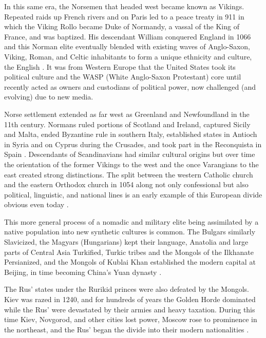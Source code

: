 In this same era, the Norsemen that headed west became known as Vikings.
Repeated raids up French rivers and on Paris led to a peace treaty in 911 in which the Viking Rollo became Duke of Normandy, a vassal of the King of France, and was baptized.
His descendant William conquered England in 1066 and this Norman elite eventually blended with existing waves of Anglo-Saxon, Viking, Roman, and Celtic inhabitants to form a unique ethnicity and culture, the English \cite{rowley2022}.
It was from Western Europe that the United States took its political culture and the WASP (White Anglo-Saxon Protestant) core until recently acted as owners and custodians of political power, now challenged (and evolving) due to new media.

Norse settlement extended as far west as Greenland and Newfoundland in the 11th century.
Normans ruled portions of Scotland and Ireland, captured Sicily and Malta, ended Byzantine rule in southern Italy, established states in Antioch in Syria and on Cyprus during the Crusades, and took part in the Reconquista in Spain \cite{rowley2022}.
Descendants of Scandinavians had similar cultural origins but over time the orientation of the former Vikings to the west and the once Varangians to the east created strong distinctions.
The split between the western Catholic church and the eastern Orthodox church in 1054 along not only confessional but also political, linguistic, and national lines is an early example of this European divide obvious even today \cite[p.8-9]{bushkovitch2011}.

This more general process of a nomadic and military elite being assimilated by a native population into new synthetic cultures is common.
The Bulgars similarly Slavicized, the Magyars (Hungarians) kept their language, Anatolia and large parts of Central Asia Turkified, Turkic tribes and the Mongols of the Ilkhanate Persianized, and the Mongols of Kublai Khan established the modern capital at Beijing, in time becoming China's Yuan dynasty \cite{golden1992}.

The Rus' states under the Rurikid princes were also defeated by the Mongols. Kiev was razed in 1240, and for hundreds of years the Golden Horde dominated while the Rus' were devastated by their armies and heavy taxation.
During this time Kiev, Novgorod, and other cities lost power, Moscow rose to prominence in the northeast, and the Rus' began the divide into their modern nationalities \cite[p.19-23]{bushkovitch2011}.


